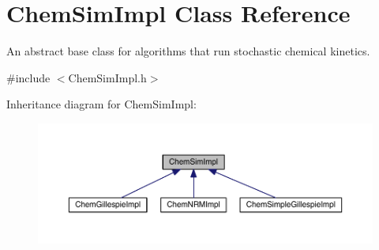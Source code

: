 \hypertarget{classChemSimImpl}{\section{Chem\+Sim\+Impl Class Reference}
\label{classChemSimImpl}
}


An abstract base class for algorithms that run stochastic chemical kinetics.  




{\ttfamily \#include $<$Chem\+Sim\+Impl.\+h$>$}



Inheritance diagram for Chem\+Sim\+Impl\+:
\nopagebreak
\begin{figure}[H]
\begin{center}
\leavevmode
\includegraphics[width=350pt]{classChemSimImpl__inherit__graph}
\end{center}
\end{figure}
